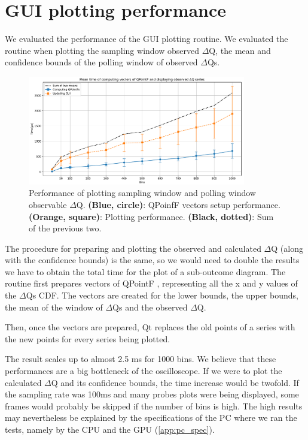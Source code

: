 \section{GUI plotting performance}
    We evaluated the performance of the GUI plotting routine. We evaluated the routine when plotting the sampling window observed $\Delta$Q, the mean and confidence bounds of the polling window of observed $\Delta$Qs. 
    \begin{figure}[H]
        \begin{center}
            \includegraphics[width = 0.85\textwidth]{img/plots.pdf}
        \end{center}
        \caption{Performance of plotting sampling window and polling window observable $\Delta$Q. \textbf{(Blue, circle)}: QPoinfF vectors setup performance. \textbf{(Orange, square)}: Plotting performance. \textbf{(Black, dotted)}: Sum of the previous two.}
    \end{figure}
    The procedure for preparing and plotting the observed and calculated $\Delta$Q (along with the confidence bounds) is the same, so we would need to double the results we have to obtain the total time for the plot of a sub-outcome diagram.
    The routine first prepares vectors of QPointF \cite{qpointf}, representing all the x and y values of the $\Delta$Qs CDF. The vectors are created for the lower bounds, the upper bounds, the mean of the window of $\Delta$Qs and the observed $\Delta$Q.

    Then, once the vectors are prepared, Qt replaces the old points of a series with the new points for every series being plotted.

    The result scales up to almost 2.5 ms for 1000 bins. We believe that these performances are a big bottleneck of the oscilloscope. If we were to plot the calculated $\Delta$Q and its confidence bounds, the time increase would be twofold. If the sampling rate was 100ms and many probes plots were being displayed, some frames would probably be skipped if the number of bins is high. The high results may nevertheless be explained by the specifications of the PC where we ran the tests, namely by the CPU and the GPU (\cref{app:pc_spec}).
